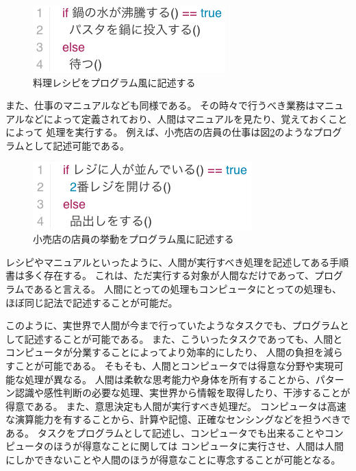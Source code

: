 \begin{figure}[htbp]
  \begin{center}
  \includegraphics[width=.4\linewidth,bb=0 0 281 98]{images/background_cooking.js.png}
  \end{center}
  \caption{料理レシピをプログラム風に記述する}
  \label{fig:background_cooking}
\end{figure}

また、仕事のマニュアルなども同様である。
その時々で行うべき業務はマニュアルなどによって定義されており、人間はマニュアルを見たり、覚えておくことによって
処理を実行する。
例えば、小売店の店員の仕事は図\ref{fig:background_retail}のようなプログラムとして記述可能である。

\begin{figure}[htbp]
  \begin{center}
  \includegraphics[width=.4\linewidth,bb=0 0 319 98]{images/background_retail.js.png}
  \end{center}
  \caption{小売店の店員の挙動をプログラム風に記述する}
  \label{fig:background_retail}
\end{figure}

レシピやマニュアルといったように、人間が実行すべき処理を記述してある手順書は多く存在する。
これは、ただ実行する対象が人間なだけであって、プログラムであると言える。
人間にとっての処理もコンピュータにとっての処理も、ほぼ同じ記法で記述することが可能だ。

このように、実世界で人間が今まで行っていたようなタスクでも、プログラムとして記述することが可能である。
また、こういったタスクであっても、人間とコンピュータが分業することによってより効率的にしたり、
人間の負担を減らすことが可能である。
そもそも、人間とコンピュータでは得意な分野や実現可能な処理が異なる。
人間は柔軟な思考能力や身体を所有することから、パターン認識や感性判断の必要な処理、実世界から情報を取得したり、干渉することが得意である。
また、意思決定も人間が実行すべき処理だ。
コンピュータは高速な演算能力を有することから、計算や記憶、正確なセンシングなどを担うべきである。
タスクをプログラムとして記述し、コンピュータでも出来ることやコンピュータのほうが得意なことに関しては
コンピュータに実行させ、人間は人間にしかできないことや人間のほうが得意なことに専念することが可能となる。

